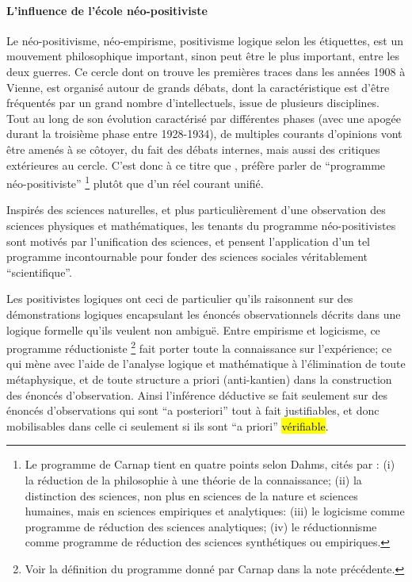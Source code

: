 
\paragraph{L'influence de l'école néo-positiviste}

Le néo-positivisme, néo-empirisme, positivisme logique selon les étiquettes, est un mouvement philosophique important, sinon peut être le plus important, entre les deux guerres. Ce cercle dont on trouve les premières traces dans les années 1908 à Vienne, est organisé autour de grands débats, dont la caractéristique est d'être fréquentés par un grand nombre d'intellectuels, issue de plusieurs disciplines. Tout au long de son évolution caractérisé par différentes phases (avec une apogée durant la troisième phase entre 1928-1934), de multiples courants d'opinions \textcite[126]{Ouelbani2006} vont être amenés à se côtoyer, du fait des débats internes, mais aussi des critiques extérieures au cercle. C'est donc à ce titre que \textcite[11]{Ouelbani2006}, préfère parler de \enquote{programme néo-positiviste} \footnote{Le programme de Carnap tient en quatre points selon Dahms, cités par \textcite{Ouelbani2006} : (i) la réduction de la philosophie à une théorie de la connaissance; (ii) la distinction des sciences, non plus en sciences de la nature et sciences humaines, mais en sciences empiriques et analytiques: (iii) le logicisme comme programme de réduction des sciences analytiques; (iv) le réductionnisme comme programme de réduction des sciences synthétiques ou empiriques.} plutôt que d'un réel courant unifié.

Inspirés des sciences naturelles, et plus particulièrement d'une observation des sciences physiques et mathématiques,  les tenants du programme néo-positivistes sont motivés par l'unification des sciences, et pensent l'application d'un tel programme incontournable pour fonder des sciences sociales véritablement \enquote{scientifique}. \textcite[1-20]{Ouelbani2006}

Les positivistes logiques ont ceci de particulier qu'ils raisonnent sur des démonstrations logiques encapsulant les énoncés observationnels décrits dans une logique formelle qu'ils veulent non ambiguë. Entre empirisme et logicisme, ce programme réductioniste \footnote{Voir la définition du programme donné par Carnap dans la note précédente.} fait porter toute la connaissance sur l'expérience; ce qui mène avec l'aide de l'analyse logique et mathématique à l'élimination de toute métaphysique, et de toute structure a priori (anti-kantien) dans la construction des énoncés d'observation. Ainsi l'inférence déductive se fait seulement sur des énoncés d'observations qui sont \foreignquote{latin}{a posteriori} tout à fait justifiables, et donc mobilisables dans celle ci seulement si ils sont \foreignquote{latin}{a priori} \hl{vérifiable}.

